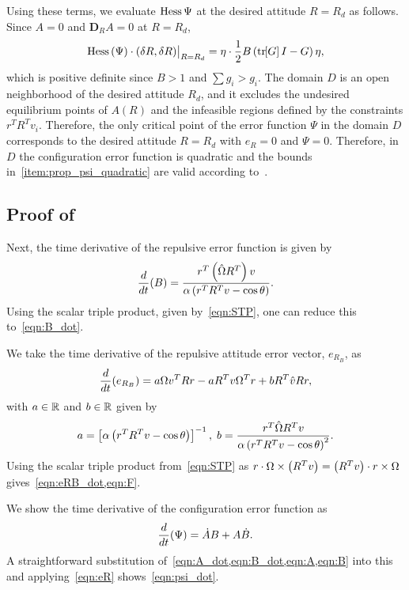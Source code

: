 Using these terms, we evaluate \( \mathrm{Hess} \, \Psi \) at the desired attitude \( R = R_d \) as follows. 
Since $A=0$ and $\mathbf{D}_R A=0$ at $R=R_d$, 
\begin{align*}
    \mathrm{Hess} \, (\Psi)\cdot (\delta R,\delta R)\big|_{R=R_d} = \eta \cdot \frac{1}{2} B \left( \mathrm{tr}\negthickspace\left[ G \right]I -  G \right) \eta , 
\end{align*}
which is positive definite since \( B > 1\) and \( \sum g_i > g_i\). 
The domain \( D \) is an open neighborhood of the desired attitude \( R_d \), and it excludes the undesired equilibrium points of \( A(R) \) and the infeasible regions defined by the constraints \( r^T R^T v_i \). 
Therefore, the only critical point of the error function $\Psi$ in the domain $D$ corresponds to the desired attitude $R=R_d$ with $e_R=0$ and $\Psi=0$. 
Therefore, in \( D \) the configuration error function is quadratic and the bounds in~\cref{item:prop_psi_quadratic} are valid according to~\cite[Proposition 6.30]{bullo2004}.

\subsection{Proof of~}\label{proof:error_dyn}
Next, the time derivative of the repulsive error function is given by
\begin{gather*}
	\frac{d }{d t} (B) = \frac{r^T \left( \hat{\Omega} R^T \right) v}{\alpha \left( r^T R^T v - \cos \theta \right)}.
\end{gather*}
Using the scalar triple product, given by~\cref{eqn:STP}, one can reduce this to~\cref{eqn:B_dot}.

We take the time derivative of the repulsive attitude error vector, \( e_{R_B} \), as
\begin{gather*}
	\frac{d }{d t}( e_{R_B} )= a \Omega v^T R r - a R^T v \Omega^T r + b R^T \hat{v} R r ,
\end{gather*}
with \( a \in \mathbb{R} \) and \( b \in \mathbb{R}\) given by 
\begin{gather*}
	a = \left[ \alpha \left( r^T R^T v - \cos \theta \right) \right]^{-1} , \;
	b = \frac{r^T \hat{\Omega} R^T v}{\alpha \left( r^T R^T v - \cos \theta \right)^2}.
\end{gather*}
Using the scalar triple product from~\cref{eqn:STP} as \( r \cdot \Omega \times \left( R^T v \right) = \left( R^T v \right) \cdot r \times \Omega \) gives~\cref{eqn:eRB_dot,eqn:F}.

We show the time derivative of the configuration error function as
\begin{gather*}
	\frac{d }{d t} (\Psi) = \dot{A} B + A \dot{B}.
\end{gather*}
A straightforward substitution of~\cref{eqn:A_dot,eqn:B_dot,eqn:A,eqn:B} into this and applying~\cref{eqn:eR} shows~\cref{eqn:psi_dot}.

